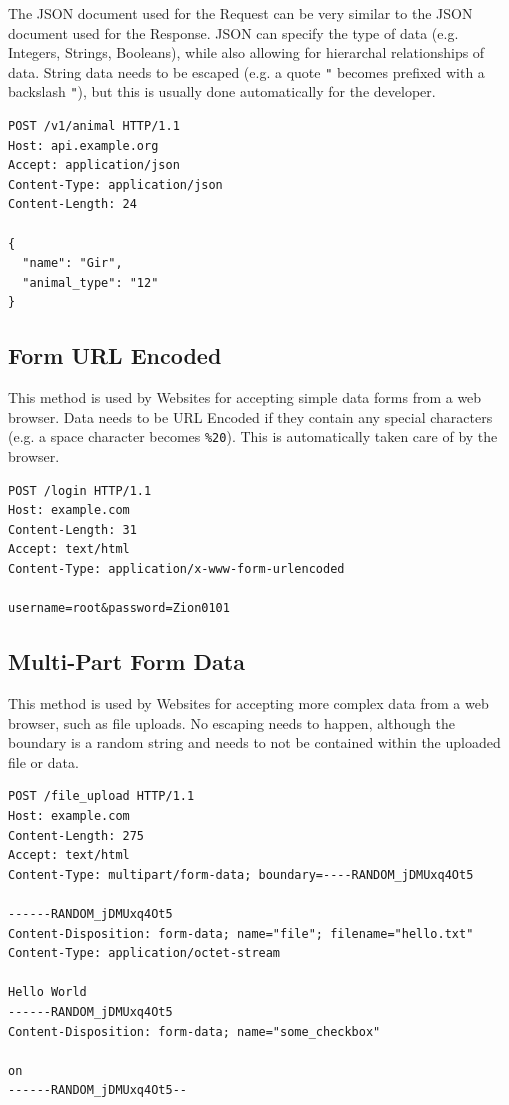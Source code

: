 \documentclass{book}
\begin{document}
The JSON document used for the Request can be very similar to the JSON document used for the Response. JSON can specify the type of data (e.g. Integers, Strings, Booleans), while also allowing for hierarchal relationships of data. String data needs to be escaped (e.g. a quote \texttt{"} becomes prefixed with a backslash \texttt{"}), but this is usually done automatically for the developer.

\begin{verbatim}
POST /v1/animal HTTP/1.1
Host: api.example.org
Accept: application/json
Content-Type: application/json
Content-Length: 24

{
  "name": "Gir",
  "animal_type": "12"
}
\end{verbatim}

\subsection{Form URL Encoded}

This method is used by Websites for accepting simple data forms from a web browser. Data needs to be URL Encoded if they contain any special characters (e.g. a space character becomes \texttt{\%20}). This is automatically taken care of by the browser.

\begin{verbatim}
POST /login HTTP/1.1
Host: example.com
Content-Length: 31
Accept: text/html
Content-Type: application/x-www-form-urlencoded

username=root&password=Zion0101
\end{verbatim}

\subsection{Multi-Part Form Data}

This method is used by Websites for accepting more complex data from a web browser, such as file uploads. No escaping needs to happen, although the boundary is a random string and needs to not be contained within the uploaded file or data.

\begin{verbatim}
POST /file_upload HTTP/1.1
Host: example.com
Content-Length: 275
Accept: text/html
Content-Type: multipart/form-data; boundary=----RANDOM_jDMUxq4Ot5

------RANDOM_jDMUxq4Ot5
Content-Disposition: form-data; name="file"; filename="hello.txt"
Content-Type: application/octet-stream

Hello World
------RANDOM_jDMUxq4Ot5
Content-Disposition: form-data; name="some_checkbox"

on
------RANDOM_jDMUxq4Ot5--
\end{verbatim}
\end{document}
